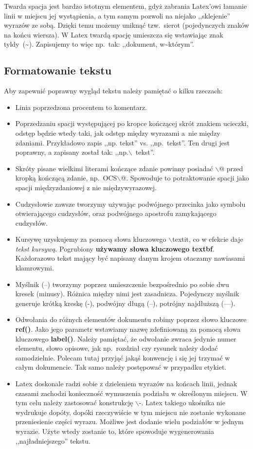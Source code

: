 Twarda spacja jest bardzo istotnym elementem, gdyż zabrania Latex'owi łamanie linii w miejscu jej wystąpienia, a tym samym pozwoli na niejako ,,sklejenie'' wyrazów ze sobą. Dzięki temu możemy uniknąć tzw.\ sierot (pojedynczych znaków na końcu wiersza). W Latex twardą spację umieszcza się wstawiając znak tyldy~(\textasciitilde). Zapisujemy to więc np.\ tak: ,,dokument, w{\textasciitilde}którym''.

\subsection{Formatowanie tekstu}

Aby zapewnić poprawny wygląd tekstu należy pamiętać o kilku rzeczach:

\begin{itemize}
 \item Linia poprzedzona procentem to komentarz.
 \item Poprzedzaniu spacji występującej po kropce kończącej skrót znakiem ucieczki, odstęp będzie wtedy taki, jak odstęp między wyrazami a~nie między zdaniami. Przykładowo zapis ,,np. tekst'' vs. ,,np.\ tekst''. Ten drugi jest poprawny, a zapisany został tak: ,,np.$\backslash$~tekst''.
 \item Skróty pisane wielkimi literami kończące zdanie powinny posiadać {$\backslash$}@ przed kropką kończącą zdanie, np.\ OCS{$\backslash$}@\@. Spowoduje to potraktowanie spacji jako spacji międzyzdaniowej z nie międzywyrazowej.
 \item Cudzysłowie zawsze tworzymy używając podwójnego przecinka jako symbolu otwierającego cudzysłów, oraz podwójnego apostrofu zamykającego cudzysłów.
 \item Kursywę uzyskujemy za pomocą słowa kluczowego {$\backslash$}textit, co w efekcie daje \textit{tekst kursywą}. Pogrubiony \textbf{używamy słowa kluczowego textbf}. Każdorazowo tekst mający być napisany danym krojem otaczamy nawiasami klamrowymi.
 \item Myślnik (--) tworzymy poprzez umieszczenie bezpośrednio po sobie dwu kresek (minusy). Różnica między nimi jest zasadnicza. Pojedynczy myślnik generuje krótką kreskę (-), podwójny długą (--), potrójny najdłuższą (---).
 \item Odwołania do różnych elementów dokumentu robimy poprzez słowo kluczowe \textbf{ref()}. Jako jego parametr wstawiamy nazwę zdefiniowaną za pomocą słowa kluczowego \textbf{label()}. Należy pamiętać, że odwołanie zwraca jedynie numer elementu, słowo opisowe, jak np.\ rozdział czy rysunek należy dodać samodzielnie. Polecam tutaj przyjąć jakąś konwencję i się jej trzymać w całym dokumencie. Tak samo należy postępować w przypadku etykiet.
 \item Latex doskonale radzi sobie z dzieleniem wyrazów na końcach linii, jednak czasami zachodzi konieczność wymuszenia podziału w określonym miejscu. W tym celu należy zastosować konstrukcję $\backslash$-. Latex takiego ukośnika nie wydrukuje dopóty, dopóki rzeczywiście w tym miejscu nie zostanie wykonane przeniesienie części wyrazu. Możliwe jest dodanie wielu podziałów w jednym wyrazie. Użyte wtedy zostanie to, które spowoduje wygenerowania ,,najładniejszego'' tekstu.
\end{itemize}

